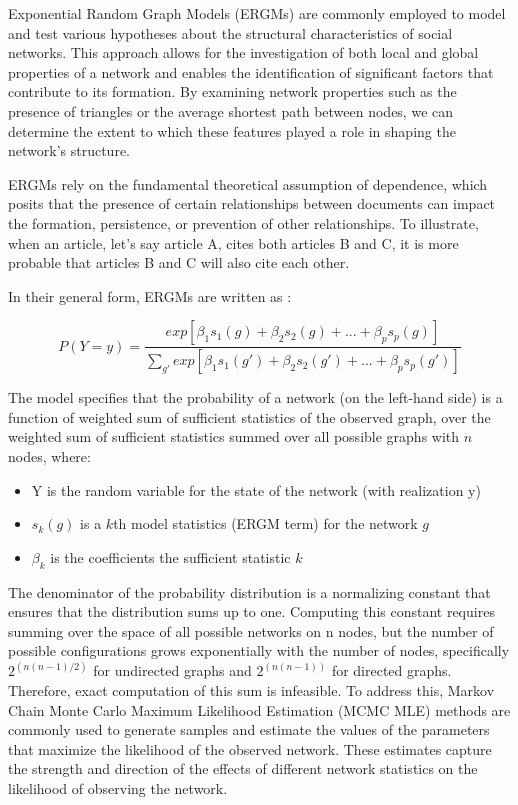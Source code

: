 Exponential Random Graph Models (ERGMs) are commonly employed to model and test various hypotheses about the structural characteristics of social networks. This approach allows for the investigation of both local and global properties of a network and enables the identification of significant factors that contribute to its formation. By examining network properties such as the presence of triangles or the average shortest path between nodes, we can determine the extent to which these features played a role in shaping the network's structure.

ERGMs rely on the fundamental theoretical assumption of dependence, which posits that the presence of certain relationships between documents can impact the formation, persistence, or prevention of other relationships. To illustrate, when an article, let's say article A, cites both articles B and C, it is more probable that articles B and C will also cite each other.

In their general form, ERGMs are written as \citep{hunter2008}:

$$
P(Y=y) = \frac{exp[\beta_1 s_1(g) + \beta_2 s_2(g) + ... + \beta_p s_p(g)]}{\sum\limits_{g'} exp[\beta_1 s_1(g') + \beta_2 s_2(g') + ... + \beta_p s_p(g')]}
$$

The model specifies that the probability of a network (on the left-hand side) is a function of weighted sum of sufficient statistics of the observed graph, over the weighted sum of sufficient statistics summed over all possible graphs with $n$ nodes, where:

\begin{itemize}
    \item Y is the random variable for the state of the network (with realization y)
    \item $s_k(g)$ is a $k$th model statistics (ERGM term) for the network $g$
    \item $\beta_k$ is the coefficients the sufficient statistic $k$
\end{itemize}

The denominator of the probability distribution is a normalizing constant that ensures that the distribution sums up to one. Computing this constant requires summing over the space of all possible networks on n nodes, but the number of possible configurations grows exponentially with the number of nodes, specifically $2^{(n(n-1)/2)}$ for undirected graphs and $2^{(n(n-1))}$ for directed graphs. Therefore, exact computation of this sum is infeasible. To address this, Markov Chain Monte Carlo Maximum Likelihood Estimation (MCMC MLE) methods are commonly used to generate samples and estimate the values of the parameters that maximize the likelihood of the observed network. These estimates capture the strength and direction of the effects of different network statistics on the likelihood of observing the network.

